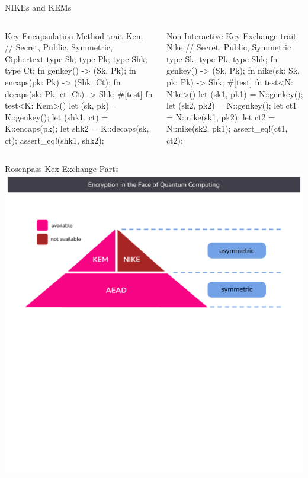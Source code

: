 \begin{frame}[fragile,t]{NIKEs and KEMs}
  \vspace{-1.5em}
  \begin{columns}[t]
    \begin{column}{.5\linewidth}
\begin{rustblock}{Key Encapsulation Method}
trait Kem {
  // Secret, Public, Symmetric, Ciphertext
  type Sk; type Pk; type Shk; type Ct;
  fn genkey() -> (Sk, Pk);
  fn encaps(pk: Pk) -> (Shk, Ct);
  fn decaps(sk: Pk, ct: Ct) -> Shk;
}
#[test]
fn test<K: Kem>() {
  let (sk, pk) = K::genkey();
  let (shk1, ct) = K::encaps(pk);
  let shk2 = K::decaps(sk, ct);
  assert_eq!(shk1, shk2);
}
\end{rustblock}
    \end{column}

    \begin{column}{.5\linewidth}
\begin{rustblock}{Non Interactive Key Exchange}
trait Nike {
  // Secret, Public, Symmetric
  type Sk; type Pk; type Shk;
  fn genkey() -> (Sk, Pk);
  fn nike(sk: Sk, pk: Pk) -> Shk;
}
#[test]
fn test<N: Nike>() {
  let (sk1, pk1) = N::genkey();
  let (sk2, pk2) = N::genkey();
  let ct1 = N::nike(sk1, pk2);
  let ct2 = N::nike(sk2, pk1);
  assert_eq!(ct1, ct2);
}
\end{rustblock}
    \end{column}

  \end{columns}
\end{frame}




\begin{frame}{Rosenpass Kex Exchange Parts}
  \centering
  \includegraphics[width=.9\linewidth,page=6,clip=true,trim=1cm 4cm 0cm 2cm]{graphics/rosenpass-key-exchanges-nike-kem.pdf}
\end{frame}




